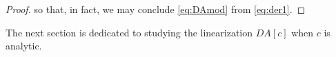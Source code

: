 \documentclass[
	fontsize=11pt, 
	twoside=false, 
	abstract=true, 
	a4paper,
]{scrartcl}
\newcommand{\eps}{\varepsilon}
\newcommand{\RR}{\mathbb{R}}
\newcommand{\dd}{\mathrm{d}}
\newcommand{\del}{\partial}
\newcommand{\supp}{\mathrm{supp}}
\newcommand{\td}[1]{\tilde{#1}}
\begin{document}
\begin{proof}
	so that, in fact, we may conclude \cref{eq:DAmod} from \cref{eq:der1}.
%
\end{proof}


The next section is dedicated to studying the linearization $DA[c]$ when $c$ is analytic.
\end{document}
